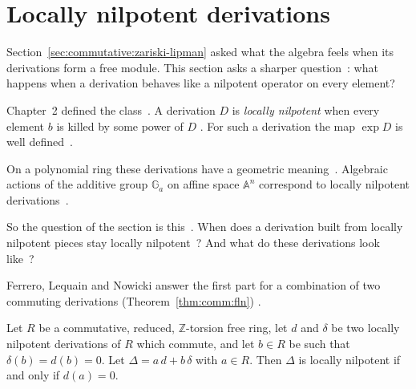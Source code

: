 \section{Locally nilpotent derivations}\label{sec:commutative:locally-nilpotent}

Section~\ref{sec:commutative:zariski-lipman} asked what the algebra feels when
its derivations form a free module. This section asks a sharper
question~\cite[p.~354]{DaigleFreudenburg1998UFD}: what happens when a
derivation behaves like a nilpotent operator on every element?

Chapter~2 defined the class~\cite[Section~1.1.9, p.~12]{Freudenburg2017}. A
derivation $D$ is \emph{locally nilpotent} when every element $b$ is killed by
some power of $D$ \cite[Section~1.1.9, p.~12]{Freudenburg2017}. For such a
derivation the map $\exp D$ is well
defined~\cite[Section~1.1.9, p.~12]{Freudenburg2017}.

On a polynomial ring these derivations have a geometric
meaning~\cite[p.~354]{DaigleFreudenburg1998UFD}. Algebraic actions of the
additive group $\mathbb{G}_a$ on affine space $\mathbb{A}^n$ correspond to
locally nilpotent derivations~\cite[p.~354]{DaigleFreudenburg1998UFD}.

So the question of the section is
this~\cite[Theorem, p.~47]{FerreroLequainNowicki1992}. When does a derivation
built from locally nilpotent pieces stay locally
nilpotent~\cite[Theorem, p.~47]{FerreroLequainNowicki1992}? And what do these
derivations look
like~\cite[Theorem, p.~47]{FerreroLequainNowicki1992}?

Ferrero, Lequain and Nowicki answer the first part for a combination of two
commuting derivations (Theorem~\ref{thm:comm:fln}) \cite[Theorem, p.~47]{FerreroLequainNowicki1992}.

\begin{theorem}\label{thm:comm:fln}
Let $R$ be a commutative, reduced, $\mathbb{Z}$-torsion free ring, let $d$
and $\delta$ be two locally nilpotent derivations of $R$ which commute, and
let $b\in R$ be such that $\delta(b) = d(b) = 0$. Let
$\Delta = a\,d + b\,\delta$ with $a\in R$. Then $\Delta$ is locally nilpotent
if and only if $d(a) = 0$.
\end{theorem}

